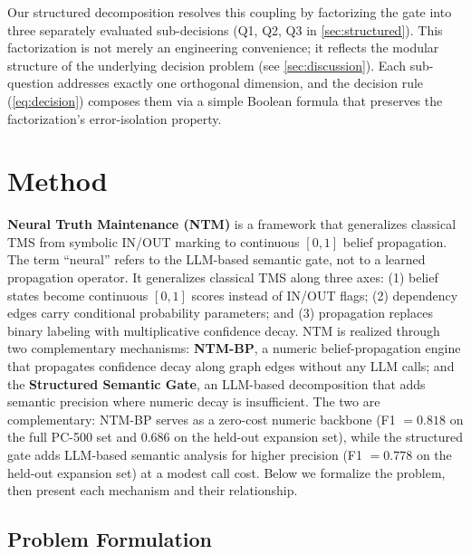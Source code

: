 \documentclass{article}
\theoremstyle{definition}
\begin{document}
Our structured decomposition resolves this coupling by factorizing the
gate into three separately evaluated sub-decisions (Q1, Q2, Q3 in
\cref{sec:structured}). This factorization is not merely an engineering
convenience; it reflects the modular structure of
the underlying decision problem (see \cref{sec:discussion}). Each
sub-question addresses exactly one orthogonal dimension, and the
decision rule (\cref{eq:decision}) composes them via a simple Boolean
formula that preserves the factorization's error-isolation property.

\section{Method}
\label{sec:method}

\textbf{Neural Truth Maintenance (NTM)} is a framework that generalizes
classical TMS from symbolic IN/OUT marking to continuous $[0,1]$ belief
propagation.  The term ``neural'' refers to the LLM-based semantic gate, not
to a learned propagation operator. It generalizes classical TMS along three axes: (1) belief
states become continuous $[0,1]$ scores instead of IN/OUT flags; (2)
dependency edges carry conditional probability parameters; and (3)
propagation replaces binary labeling with multiplicative confidence decay.
NTM is realized through two complementary mechanisms:
\textbf{NTM-BP}, a numeric belief-propagation engine that propagates
confidence decay along graph edges without any LLM calls; and the
\textbf{Structured Semantic Gate}, an LLM-based decomposition that adds
semantic precision where numeric decay is insufficient. The two are
complementary: NTM-BP serves as a zero-cost numeric backbone (F1
$=0.818$ on the full PC-500 set and $0.686$ on the held-out
expansion set), while the structured gate adds LLM-based
semantic analysis for higher precision (F1 $=0.778$ on the held-out
expansion set) at a modest call cost. Below we formalize the problem, then
present each mechanism and their relationship.

\subsection{Problem Formulation}
\label{sec:problem}
\end{document}
